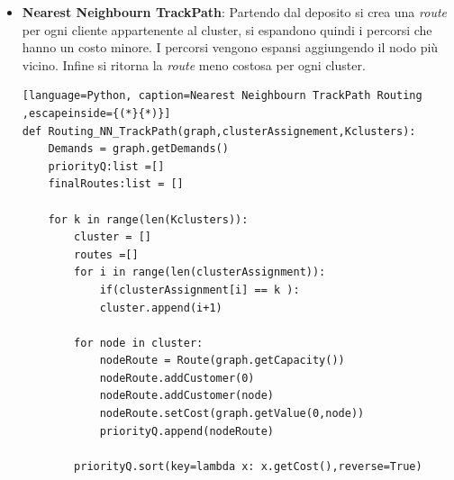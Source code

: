 \documentclass[]{article}
\begin{document}
\begin{itemize}
\begin{lstlisting}[language=Python, caption=NearestNeighbourn Routing ,escapeinside={(*}{*)}]
\end{lstlisting}
Listing 5 presenta lo pseudocodice: la firma del metodo in linea 1 richiede il grafo, l'assegnamento creato dal GAP solver, i \textit{Kcluster} selezionati dalla procedura precedente. La riga 2,3 estraggono le informazioni dal grafo, la 4 inizializza la soluzione da ritornare \textit{routes} a vuoto. Da 6 a 10 si creano i singoli cluster, scorrendo la lista \textit{clusterAssignement} e individuando a quale cluster sono stati assegnati i clienti. Per ogni cluster è creata una lista \textit{cluster}. Dentro al ciclo che scorre i cluster in 6, si inizializza la \emph{appoRoute},con capacità e deposito 12,13. Questa \emph{route} collegherà i clienti della lista  \textit{cluster} che abbiamo appena popolato. All'interno del while a riga 15, si estrae l'ultimo nodo inserito in \emph{appoRoute} e si calcolano tutte le distanze dei clienti che popolano la lista \textit{cluster} 16, 17. Si trova il più vicino al nodo estratto \textit{prevNode} 18. Se il nodo non è ancora presente nella  lista di clienti di \emph{appoRoute}, lo aggiungo e lo rimuvo dalla lista \textit{cluster} 20,21. Una volta raggiunti tutti i clienti chiudo la strada aggiungendo il deposito alal fine della lista di clienti,e aggiungo \textit{appoRoute} a \textit{routes}. Dopo aver esaurito i componenti di \textit{Kcluster}, ritorno la soluzione \textit{routes}.
\newpage
\item \textbf{Nearest Neighbourn TrackPath}: Partendo dal deposito si crea una \emph{route} per ogni cliente appartenente al cluster, si espandono quindi i percorsi che hanno un costo minore. I percorsi vengono espansi aggiungendo il nodo più vicino. Infine si ritorna la \emph{route} meno costosa per ogni cluster.

\begin{lstlisting}[language=Python, caption=Nearest Neighbourn TrackPath Routing ,escapeinside={(*}{*)}]
def Routing_NN_TrackPath(graph,clusterAssignement,Kclusters):
	Demands = graph.getDemands()
	priorityQ:list =[]
	finalRoutes:list = []
	
	for k in range(len(Kclusters)):
		cluster = []
		routes =[]
		for i in range(len(clusterAssignment)):
			if(clusterAssignment[i] == k ):
			cluster.append(i+1)
	
		for node in cluster:          
			nodeRoute = Route(graph.getCapacity())
			nodeRoute.addCustomer(0)
			nodeRoute.addCustomer(node)
			nodeRoute.setCost(graph.getValue(0,node))
			priorityQ.append(nodeRoute)
		
		priorityQ.sort(key=lambda x: x.getCost(),reverse=True)
	

\end{lstlisting}
\end{itemize}
\end{document}
